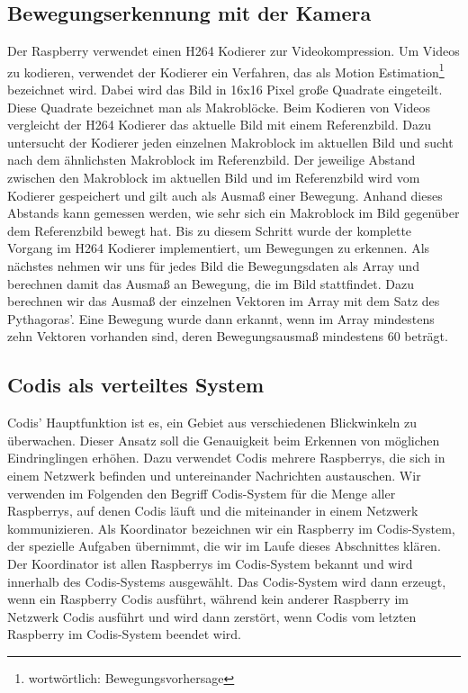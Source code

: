 \documentclass[journal]{IEEEtran}
\begin{document}
\subsection{Bewegungserkennung mit der Kamera}

Der Raspberry verwendet einen H264 Kodierer zur Videokompression. Um Videos zu kodieren, verwendet der Kodierer ein Verfahren, das als Motion Estimation\footnote{wortwörtlich: Bewegungsvorhersage}\cite{estimation} bezeichnet wird. Dabei wird das Bild in 16x16 Pixel große Quadrate eingeteilt. Diese Quadrate bezeichnet man als Makroblöcke. Beim Kodieren von Videos vergleicht der H264 Kodierer das aktuelle Bild mit einem Referenzbild. Dazu untersucht der Kodierer jeden einzelnen Makroblock im aktuellen Bild und sucht nach dem ähnlichsten Makroblock im Referenzbild. Der jeweilige Abstand zwischen den Makroblock im aktuellen Bild und im Referenzbild wird vom Kodierer gespeichert und gilt auch als Ausmaß einer Bewegung. Anhand dieses Abstands kann gemessen werden, wie sehr sich ein Makroblock im Bild gegenüber dem Referenzbild bewegt hat. Bis zu diesem Schritt wurde der komplette Vorgang im H264 Kodierer implementiert, um Bewegungen zu erkennen.\cite{vektoren} Als nächstes nehmen wir uns für jedes Bild die Bewegungsdaten als Array und berechnen damit das Ausmaß an Bewegung, die im Bild stattfindet. Dazu berechnen wir das Ausmaß der einzelnen Vektoren im Array mit dem Satz des Pythagoras'. Eine Bewegung wurde dann erkannt, wenn im Array mindestens zehn Vektoren vorhanden sind, deren Bewegungsausmaß mindestens 60 beträgt.\cite{motion2}

\subsection{Codis als verteiltes System}

Codis' Hauptfunktion ist es, ein Gebiet aus verschiedenen Blickwinkeln zu überwachen. Dieser Ansatz soll die Genauigkeit beim Erkennen von möglichen Eindringlingen erhöhen. Dazu verwendet Codis mehrere Raspberrys, die sich in einem Netzwerk befinden und untereinander Nachrichten austauschen. Wir verwenden im Folgenden den Begriff Codis-System für die Menge aller Raspberrys, auf denen Codis läuft und die miteinander in einem Netzwerk kommunizieren. Als Koordinator bezeichnen wir ein Raspberry im Codis-System, der spezielle Aufgaben übernimmt, die wir im Laufe dieses Abschnittes klären. Der Koordinator ist allen Raspberrys im Codis-System bekannt und wird innerhalb des Codis-Systems ausgewählt. Das Codis-System wird dann erzeugt, wenn ein Raspberry Codis ausführt, während kein anderer Raspberry im Netzwerk Codis ausführt und wird dann zerstört, wenn Codis vom letzten Raspberry im Codis-System beendet wird. 
\end{document}
